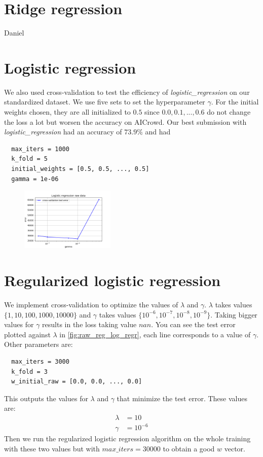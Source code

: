 \documentclass[11pt, a4paper, twoside]{article}
\begin{document}
\section{Ridge regression}
Daniel

\section{Logistic regression}
We also used cross-validation to test the efficiency of
\textit{logistic\_regression} on our standardized dataset.
We use five sets to set the hyperparameter $\gamma$.
For the initial weights chosen, they are all initialized to $0.5$ since $0.0, 0.1, ..., 0.6$ do not change the loss a lot but worsen the accuracy on AICrowd.
Our best submission with \textit{logistic\_regression} had an accuracy of $73.9\%$ and had 
\begin{lstlisting}
  max_iters = 1000
  k_fold = 5
  initial_weights = [0.5, 0.5, ..., 0.5]
  gamma = 1e-06
\end{lstlisting}

\begin{figure}[h]
  \includegraphics[width=0.4\textwidth]{raw_data_logistic_regression.png}
    \label{fig:log_reg}
\end{figure}

\section{Regularized logistic regression}
We implement cross-validation to optimize the values of $\lambda$ and $\gamma$. $\lambda$ takes values
$\{1,10,100,1000,10000\}$ and $\gamma$ takes values $\{10^{-6},10^{-7},10^{-8},10^{-9}\}$. Taking bigger
values for $\gamma$ results in the loss taking value $nan$. You can see the test error plotted against $\lambda$ in \ref{fig:raw_reg_log_regr}, each line corresponds to a value of $\gamma$. Other parameters are: 
\begin{lstlisting}
  max_iters = 3000
  k_fold = 3
  w_initial_raw = [0.0, 0.0, ..., 0.0]
\end{lstlisting}

This outputs the values for $\lambda$ and $\gamma$ that minimize the test error. These values are:
\begin{align*}
  \lambda &= 10 \\
  \gamma &= 10^{-6}
\end{align*}
Then we run the regularized logistic regression algorithm on the whole training with these two values but with $max\_iters = 30000$ to obtain a good $w$ vector.
\end{document}
